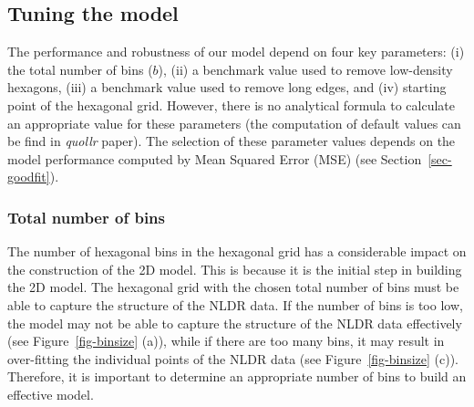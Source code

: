 \documentclass[
  12pt]{article}
\begin{document}
\hypertarget{tuning-the-model}{%
\subsection{Tuning the model}\label{tuning-the-model}}

The performance and robustness of our model depend on four key
parameters: (i) the total number of bins (\(b\)), (ii) a benchmark value
used to remove low-density hexagons, (iii) a benchmark value used to
remove long edges, and (iv) starting point of the hexagonal grid.
However, there is no analytical formula to calculate an appropriate
value for these parameters (the computation of default values can be
find in \emph{quollr} paper). The selection of these parameter values
depends on the model performance computed by Mean Squared Error (MSE)
(see Section~\ref{sec-goodfit}).

\hypertarget{total-number-of-bins}{%
\subsubsection{Total number of bins}\label{total-number-of-bins}}

The number of hexagonal bins in the hexagonal grid has a considerable
impact on the construction of the 2D model. This is because it is the
initial step in building the 2D model. The hexagonal grid with the
chosen total number of bins must be able to capture the structure of the
NLDR data. If the number of bins is too low, the model may not be able
to capture the structure of the NLDR data effectively (see
Figure~\ref{fig-binsize} (a)), while if there are too many bins, it may
result in over-fitting the individual points of the NLDR data (see
Figure~\ref{fig-binsize} (c)). Therefore, it is important to determine
an appropriate number of bins to build an effective model.
\end{document}
